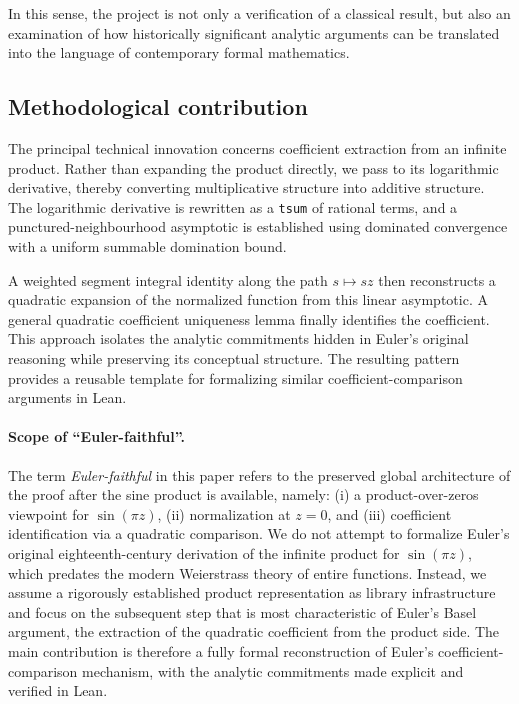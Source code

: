\documentclass[11pt,a4paper]{article}
\theoremstyle{plain}
\theoremstyle{definition}
\begin{document}
In this sense, the project is not only a verification of a classical result, but also an examination of how historically significant analytic arguments can be translated into the language of contemporary formal mathematics.

\subsection{Methodological contribution}

The principal technical innovation concerns coefficient extraction from an infinite product. Rather than expanding the product directly, we pass to its logarithmic derivative, thereby converting multiplicative structure into additive structure. The logarithmic derivative is rewritten as a \texttt{tsum} of rational terms, and a punctured-neighbourhood asymptotic is established using dominated convergence with a uniform summable domination bound.

A weighted segment integral identity along the path \(s \mapsto sz\) then reconstructs a quadratic expansion of the normalized function from this linear asymptotic. A general quadratic coefficient uniqueness lemma finally identifies the coefficient. This approach isolates the analytic commitments hidden in Euler’s original reasoning while preserving its conceptual structure. The resulting pattern provides a reusable template for formalizing similar coefficient-comparison arguments in Lean.

\paragraph{Scope of ``Euler-faithful''.}
The term \emph{Euler-faithful} in this paper refers to the preserved global architecture of the proof after the sine product is available, namely: (i) a product-over-zeros viewpoint for \(\sin(\pi z)\), (ii) normalization at \(z=0\), and (iii) coefficient identification via a quadratic comparison. We do not attempt to formalize Euler’s original eighteenth-century derivation of the infinite product for \(\sin(\pi z)\), which predates the modern Weierstrass theory of entire functions. Instead, we assume a rigorously established product representation as library infrastructure and focus on the subsequent step that is most characteristic of Euler’s Basel argument, the extraction of the quadratic coefficient from the product side. The main contribution is therefore a fully formal reconstruction of Euler’s coefficient-comparison mechanism, with the analytic commitments made explicit and verified in Lean.
\end{document}
